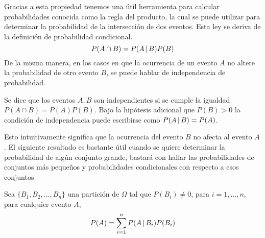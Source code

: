 Gracias a esta propiedad tenemos una útil herramienta para calcular probabilidades conocida como la regla del producto, la cual se puede utilizar para determinar la probabilidad de la intersección de dos eventos. Esta ley se deriva de la definición de probabilidad condicional.
$$P(A\cap B)=P(A\thinspace|\thinspace B)P(B)$$
De la misma manera, en los casos en que la ocurrencia de un evento $A$ no altere la probabilidad de otro evento $B$, se puede hablar de independencia de probabilidad.
\begin{Def}
    Se dice que los eventos $A, B$ son independientes si se cumple la igualdad $P(A\cap B)=P(A)P(B)$. Bajo la hipótesis adicional que $P(B)>0$ la condición de independencia puede escribirse como $P(A\thinspace|\thinspace B)=P(A)$.
\end{Def}
 Esto intuitivamente significa que la ocurrencia del evento $B$ no afecta al evento $A$.
El siguiente resultado es bastante útil cuando se quiere determinar la probabilidad de algún conjunto grande, bastará con hallar las probabilidades de conjuntos más pequeños y probabilidades condicionales con respecto a esos conjuntos
\begin{Teo}
    Sea $\{B_1,B_2,\ldots,B_n\}$ una partición de $\Omega$ tal que $P(B_i)\not=0$, para  $i=1,\ldots,n$, para cualquier evento $A$, $$P(A)=\sum_{i=1}^n P(A\thinspace|\thinspace B_i)P(B_i)$$
\end{Teo}

